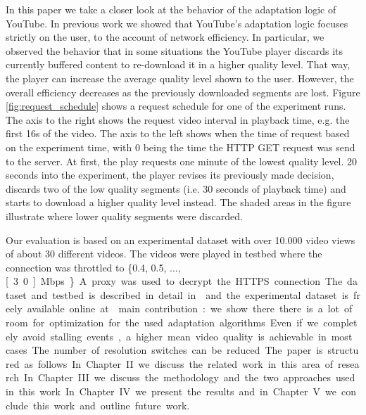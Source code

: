 In this paper we take a closer look at the behavior of the adaptation logic of YouTube.
In previous work we showed that YouTube's adaptation logic focuses strictly on the user, to the account of network efficiency.
In particular, we observed the behavior that in some situations the YouTube player discards its currently buffered content to re-download it in a higher quality level.
That way, the player can increase the average quality level shown to the user.
However, the overall efficiency decreases as the previously downloaded segments are lost.
Figure \ref{fig:request_schedule} shows a request schedule for one of the experiment runs.
The axis to the right shows the request video interval in playback time, e.g. the first 16s of the video.
The axis to the left shows when the time of request based on the experiment time, with 0 being the time the HTTP GET request was send to the server.
At first, the play requests one minute of the lowest quality level.
20 seconds into the experiment, the player revises its previously made decision, discards two of the low quality segments (i.e. 30 seconds of playback time) and starts to download a higher quality level instead.
The shaded areas in the figure illustrate where lower quality segments were discarded.

Our evaluation is based on an experimental dataset with over 10.000 video views of about 30 different videos.
The videos were played in testbed where the connection was throttled to \{0.4, 0.5, ..., \unit[3.0]{Mbps}\}.
A proxy was used to decrypt the HTTPS connection.
The dataset and testbed is described in detail in \cite{sieber16sacrificing,sieber15costaggressive} and the experimental dataset is freely available online at \cite{traces}. 


main contribution: we show there there is a lot of room for optimization for the used adaptation algorithms. Even if we completely avoid stalling events, a higher mean video quality is achievable in most cases. The number of resolution switches can be reduced.

The paper is structured as follows. In Chapter II we discuss the related work in this area of research. 
In Chapter III we discuss the methodology and the two approaches used in this work.
In Chapter IV we present the results and in Chapter V we conclude this work and outline future work.

